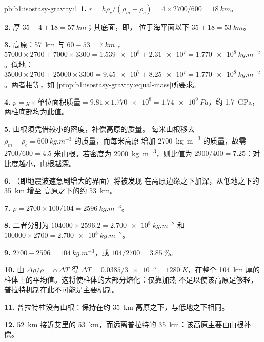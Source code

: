 \begin{solution}{pb:b1:isostasy-gravity:1}
\textbf{1.} $r = h\rho_c/(\rho_m - \rho_c) = 4\times2700/600 = \qty{18}{km}$。

\textbf{2.} 厚 $35 + 4 + 18 = \qty{57}{km}$；其底面，即，
位于海平面以下 $35 + 18 = \qty{53}{km}$。

\textbf{3.} 高原：\qty{57}{km} 与 $60 - 53 = \qty{7}{km}$ ，
$\num{57000}\times2700 + \num{7000}\times3300 = \num{1.539e8} + \num{2.31e7} =
\qty{1.770e8}{kg.m^{-2}}$。低地：$\num{35000}\times2700 + \num{25000}\times3300
= \num{9.45e7} + \num{8.25e7} = \qty{1.770e8}{kg.m^{-2}}$。两者相等，如
\cref{prop:b1:isostasy-gravity:equal-mass}所要求。

\textbf{4.} $p = g\times\text{单位面积质量} = 9.81\times\num{1.770e8} =
\qty{1.74e9}{Pa}$，约 \qty{1.7}{GPa}，两柱底部均为此值。

\textbf{5.} 山根须凭借较小的密度，补偿高原的质量。
每米山根移去 $\rho_m - \rho_c = \qty{600}{kg.m^{-3}}$ 的质量，而每米高原
增加 \qty{2700}{kg.m^{-3}} 的质量，故需 $2700/600 = 4.5$
米山根。若密度为 \qty{2900}{kg.m^{-3}}，则比值为
$2900/400 = 7.25$：对比度越小，山根越深。

\textbf{6.} （即地震波速急剧增大的界面）将被发现
在高原边缘之下加深，从低地之下的 \qty{35}{km} 增至
高原之下的约 \qty{53}{km}。

\textbf{7.} $\rho = 2700\times100/104 = \qty{2596}{kg.m^{-3}}$。

\textbf{8.} 二者分别为 $\num{104000}\times2596.2 = \qty{2.700e8}{kg.m^{-2}}$
和 $\num{100000}\times2700 = \qty{2.700e8}{kg.m^{-2}}$。

\textbf{9.} $2700 - 2596 = \qty{104}{kg.m^{-3}}$，或 $104/2700 =
\qty{3.85}{\percent}$。

\textbf{10.} 由 $\Delta\rho/\rho = \alpha\,\Delta T$ 得 $\Delta T =
0.0385/\num{3e-5} = \qty{1280}{K}$，在整个 \qty{104}{km}
厚的柱体上的平均值。这将使柱体的大部分熔化：仅靠加热
不足以使该高原足够轻，普拉特机制在此不可能是主要机制。

\textbf{11.} 普拉特柱没有山根：保持在约 \qty{35}{km}
高原之下，与低地之下相同。

\textbf{12.} \qty{52}{km} 接近艾里的 \qty{53}{km}，而远离普拉特的
\qty{35}{km}：该高原主要由山根补偿。


\end{solution}
